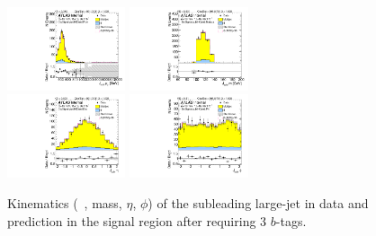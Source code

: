\begin{figure}[htbp!]
\begin{center}
\includegraphics[width=0.31\textwidth,angle=-90]{figures/boosted/Signal/b77_ThreeTag_Signal_sublHCand_Pt_m.pdf}
\includegraphics[width=0.31\textwidth,angle=-90]{figures/boosted/Signal/b77_ThreeTag_Signal_sublHCand_Mass_s.pdf}\\
\includegraphics[width=0.31\textwidth,angle=-90]{figures/boosted/Signal/b77_ThreeTag_Signal_sublHCand_Eta.pdf}
\includegraphics[width=0.31\textwidth,angle=-90]{figures/boosted/Signal/b77_ThreeTag_Signal_sublHCand_Phi.pdf}
  \caption{Kinematics (\pt~, mass, $\eta$, $\phi$) of the subleading large-\R jet in data and prediction in the signal region after requiring 3 $b$-tags. }
  \label{fig:boosted-3b-signal-ak10-subl}
\end{center}
\end{figure}

